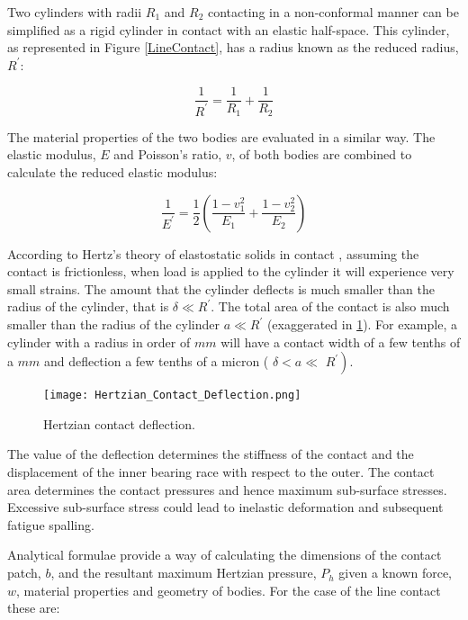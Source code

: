 Two cylinders with radii $R_1$ and $R_2$ contacting in a non-conformal manner can be simplified as a rigid cylinder in contact with an elastic half-space. This cylinder, as represented in Figure \ref{LineContact}, has a radius known as the reduced radius, $R^{\prime}$:

\begin{equation}\label{eq2.1}
	\frac{1}{R^{\prime}}=\frac{1}{R_1}+\frac{1}{R_2}
\end{equation}

The material properties of the two bodies are evaluated in a similar way. The elastic modulus, $E$ and Poisson's ratio, $v$, of both bodies are combined to calculate the reduced elastic modulus:

\begin{equation}\label{eq2.2}
	\frac{1}{E^{\prime}}=\frac{1}{2}\left(\frac{1-v_1^2}{E_1}+\frac{1-v_2^2}{E_2}\right)
\end{equation}

According to Hertz's theory of elastostatic solids in contact \cite{Hertz1881}, assuming the contact is frictionless, when load is applied to the cylinder it will experience very small strains. The amount that the cylinder deflects is much smaller than the radius of the cylinder, that is $\delta \ll R^{\prime}$. The total area of the contact is also much smaller than the radius of the cylinder $a \ll R^{\prime}$ (exaggerated in \ref{HertzianContactDeflection}). For example, a cylinder with a radius in order of $mm$ will have a contact width of a few tenths of a $mm$ and deflection a few tenths of a micron ( $\delta<a \ll$ $\left.R^{\prime}\right)$.

\begin{figure}
	\centerline{\texttt{[image: Hertzian\_Contact\_Deflection.png]}}
	\caption{Hertzian contact deflection.}
	\label{HertzianContactDeflection}
\end{figure}

The value of the deflection determines the stiffness of the contact and the displacement of the inner bearing race with respect to the outer. The contact area determines the contact pressures and hence maximum sub-surface stresses. Excessive sub-surface stress could lead to inelastic deformation and subsequent fatigue spalling.

Analytical formulae provide a way of calculating the dimensions of the contact patch, $b$, and the resultant maximum Hertzian pressure, $P_h$ given a known force, $w$, material properties and geometry of bodies. For the case of the line contact these are:

